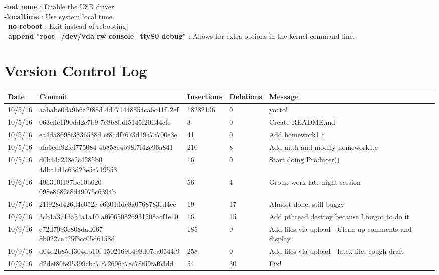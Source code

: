\documentclass[letterpaper,10pt,draftclsnofoot,titlepage,onecolumn]{IEEEtran}
\begin{document}
	\textbf{-net none} : Enable the USB driver. \\
	
	\textbf{-localtime} : Use system local time. \\
	
	\textbf{--no-reboot} : Exit instead of rebooting. \\
	
	\textbf{--append "root=/dev/vda rw console=ttyS0 debug"} : Allows for extra options in the kernel command line. \\
	
	\clearpage
	\section{Version Control Log}
	
\begin{center}
 \begin{tabular}{| m{2cm} | m{5cm} | m{2cm} | m{2cm} | m{3cm} | } 
 \hline
 Date & Commit & Insertions & Deletions & Message \\ [0.5ex] 
 \hline\hline
  10/5/16 & aababe0da9b6a2f88d 4d771448854ca6c41f12ef & 18282136 & 0 & yocto! \\
 \hline
  10/5/16 & 063effe1f90dd2e7b9 7e8b8bdf5145f20ff44cfe & 3 & 0 & Create README.md \\
 \hline
  10/5/16 & ea4da8698f3836538d ef8cdf7673d19a7a700e3e & 41 & 0 & Add homework1 c \\
 \hline
  10/5/16 & afa6edf92fef775084 4b858e4b98f7f42c96a841 & 210 & 8 & Add mt.h and modify homework1.c \\
 \hline
  10/5/16 & d0b44c238e2c4285b0 4dba1d1c63d23e5a719553 & 16 & 0 & Start doing Producer() \\
 \hline
  10/6/16 & 496310f187be10b620 098e8682c8d49075c6394b & 56 & 4 & Group work late night session \\
 \hline
   10/7/16 & 21f928d426d4c052c e6301ffdc8a0768783ed4ee & 19 & 17 & Almost done, still buggy \\
 \hline
   10/9/16 & 3cb1a3713a54a1a10 af60650826931208acf1e10 & 16 & 15 & Add pthread destroy because I forgot to do it \\
 \hline
   10/9/16 & e72d7993e808dad667 8b0227e425f3cc05d6158d & 185 & 0 & Add files via upload - Clean up comments and display\\
 \hline
   10/9/16 & d04d2b85ef304db10f 1502169b498d07ea0544f9 & 258 & 0 & Add files via upload - latex files rough draft\\
 \hline
   10/9/16 & d2def80fe95399cba7 f72696a7ec78f59faf63dd & 54 & 30 & Fix!\\
 \hline
 
\end{tabular}
\end{center}
	
\end{document}
